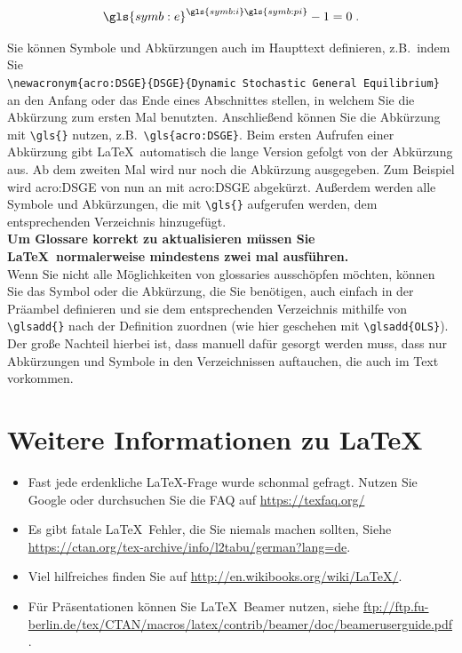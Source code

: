 \documentclass[a4paper,12pt]{scrartcl} %
\begin{document}
\begin{equation}
	\gls{symb:e}^{\gls{symb:i}\gls{symb:pi}}-1=0 \;.
\end{equation}



Sie können Symbole und Abkürzungen auch im Haupttext definieren, z.B.\ indem Sie\\
\verb|\newacronym{acro:DSGE}{DSGE}{Dynamic Stochastic General Equilibrium}|\\
an den Anfang oder das Ende eines Abschnittes stellen, in welchem Sie die Abkürzung zum ersten Mal benutzten. Anschließend können Sie die Abkürzung mit \verb|\gls{}| nutzen, z.B.\ \verb|\gls{acro:DSGE}|. Beim ersten Aufrufen einer Abkürzung gibt \LaTeX\ automatisch die lange Version gefolgt von der Abkürzung aus. Ab dem zweiten Mal wird nur noch die Abkürzung ausgegeben. Zum Beispiel wird \gls{acro:DSGE} von nun an mit \gls{acro:DSGE} abgekürzt. Außerdem werden alle Symbole und Abkürzungen, die mit \verb|\gls{}| aufgerufen werden, dem entsprechenden Verzeichnis hinzugefügt.\\
\textbf{Um Glossare korrekt zu aktualisieren müssen Sie \LaTeX\ normalerweise mindestens zwei mal ausführen.}\\

Wenn Sie nicht alle Möglichkeiten von glossaries ausschöpfen möchten, können Sie das Symbol oder die Abkürzung, die Sie benötigen, auch einfach in der Präambel definieren und sie dem entsprechenden Verzeichnis mithilfe von \verb|\glsadd{}| nach der Definition zuordnen (wie hier geschehen mit \verb|\glsadd{OLS}|). Der große Nachteil hierbei ist, dass manuell dafür gesorgt werden muss, dass nur Abkürzungen und Symbole in den Verzeichnissen auftauchen, die auch im Text vorkommen.



\clearpage

\section{Weitere Informationen zu \LaTeX}

\begin{itemize}
	\item Fast jede erdenkliche \LaTeX-Frage wurde schonmal gefragt. Nutzen Sie Google oder durchsuchen Sie die FAQ auf \url{https://texfaq.org/}
	\item Es gibt fatale \LaTeX\ Fehler, die Sie niemals machen sollten, Siehe \url{https://ctan.org/tex-archive/info/l2tabu/german?lang=de}.
	\item Viel hilfreiches finden Sie auf \url{http://en.wikibooks.org/wiki/LaTeX/}.
	\item Für Präsentationen können Sie \LaTeX\ Beamer nutzen, siehe \url{ftp://ftp.fu-berlin.de/tex/CTAN/macros/latex/contrib/beamer/doc/beameruserguide.pdf}.
\end{itemize}
\end{document}
